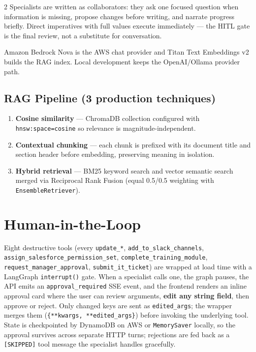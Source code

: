\documentclass[10pt,a4paper]{article}
\begin{document}
\begin{multicols}{2}
Specialists are written as collaborators: they ask one focused question when information is missing, propose changes before writing, and narrate progress briefly. Direct imperatives with full values execute immediately — the HITL gate is the final review, not a substitute for conversation.

Amazon Bedrock Nova is the AWS chat provider and Titan Text Embeddings v2 builds the RAG index. Local development keeps the OpenAI/Ollama provider path.

\subsection{RAG Pipeline (3 production techniques)}
\begin{enumerate}
  \item \textbf{Cosine similarity} — ChromaDB collection configured with \texttt{hnsw:space=cosine} so relevance is magnitude-independent.
  \item \textbf{Contextual chunking} — each chunk is prefixed with its document title and section header before embedding, preserving meaning in isolation.
  \item \textbf{Hybrid retrieval} — BM25 keyword search and vector semantic search merged via Reciprocal Rank Fusion (equal 0.5/0.5 weighting with \texttt{EnsembleRetriever}).
\end{enumerate}

\section{Human-in-the-Loop}

Eight destructive tools (every \texttt{update\_*}, \texttt{add\_to\_slack\_channels}, \texttt{assign\_salesforce\_permission\_set}, \texttt{complete\_training\_module}, \texttt{request\_manager\_approval}, \texttt{submit\_it\_ticket}) are wrapped at load time with a LangGraph \texttt{interrupt()} gate. When a specialist calls one, the graph pauses, the API emits an \texttt{approval\_required} SSE event, and the frontend renders an inline approval card where the user can review arguments, \textbf{edit any string field}, then approve or reject. Only changed keys are sent as \texttt{edited\_args}; the wrapper merges them (\texttt{\{**kwargs, **edited\_args\}}) before invoking the underlying tool. State is checkpointed by DynamoDB on AWS or \texttt{MemorySaver} locally, so the approval survives across separate HTTP turns; rejections are fed back as a \texttt{[SKIPPED]} tool message the specialist handles gracefully.


\end{multicols}
\end{document}
